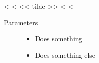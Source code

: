 \documentclass[letterpaper,10pt,english]{sphinxmanual}
\begin{document}
\vspace{5px}

\begin{fulllineitems}
\label{\detokenize{index:foo}}
<%
\pysigstartsignatures
<%
<< tilde >>
<%
\pysigstopsignatures
<%
\vspace{10px}\begin{flushleft}\begin{description}
\item[{Parameters}] \leavevmode\begin{itemize}
\item {}
 \textendash{} Does something

\item {}
 \textendash{} Does something else

\end{itemize}

\end{description}\end{flushleft}\vspace{10px}

\end{fulllineitems}



\vspace{10px}




\vspace{-5px}
\end{document}
